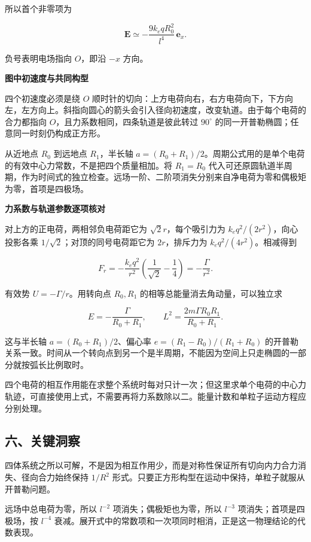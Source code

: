 \documentclass[12pt,a4paper,UTF8]{ctexart}
\begin{document}
所以首个非零项为

\[
\boxed{
\bm E
\simeq-\frac{9k_eqR_0^2}{l^4}\,\bm e_x
}.
\tag{13}
\]

负号表明电场指向 \(O\)，即沿 \(-x\) 方向。

\textbf{图中初速度与共同构型}

四个初速度必须是绕 \(O\)
顺时针的切向：上方电荷向右，右方电荷向下，下方向左，左方向上。斜指向圆心的箭头会引入径向初速度，改变轨道。由于每个电荷的合力都指向
\(O\)，且力系数相同，四条轨道是彼此转过 \(90^\circ\)
的同一开普勒椭圆；任意同一时刻仍构成正方形。

从近地点 \(R_0\) 到远地点 \(R_1\)，半长轴
\(a=(R_0+R_1)/2\)。周期公式用的是单个电荷的有效中心力常数，不是把四个质量相加。将
\(R_1=R_0\)
代入可还原圆轨道半周期，作为时间式的独立检查。远场一阶、二阶项消失分别来自净电荷为零和偶极矩为零，首项是四极场。

\textbf{力系数与轨道参数逐项核对}

对上方的正电荷，两相邻负电荷距它为 \(\sqrt2r\)，每个吸引力为
\(k_eq^2/(2r^2)\)，向心投影各乘 \(1/\sqrt2\)；对顶的同号电荷距它为
\(2r\)，排斥力为 \(k_eq^2/(4r^2)\)。相减得到

\[F_r=-\frac{k_eq^2}{r^2}\left(\frac1{\sqrt2}-\frac14\right)=-\frac\Gamma{r^2}.\]

有效势 \(U=-\Gamma/r\)。用转向点 \(R_0,R_1\)
的相等总能量消去角动量，可以独立求

\[E=-\frac{\Gamma}{R_0+R_1},\qquad L^2=\frac{2m\Gamma R_0R_1}{R_0+R_1}.\]

这与半长轴 \(a=(R_0+R_1)/2\)、偏心率 \(e=(R_1-R_0)/(R_1+R_0)\)
的开普勒关系一致。时间从一个转向点到另一个是半周期，不能因为空间上只走椭圆的一部分就按弧长比例取时。

四个电荷的相互作用能在求整个系统时每对只计一次；但这里求单个电荷的中心力轨迹，可直接使用上式，不需要再将力系数除以二。能量计数和单粒子运动方程应分别处理。

\subsection{六、关键洞察}\label{ux516dux5173ux952eux6d1eux5bdf-4}

四体系统之所以可解，不是因为相互作用少，而是对称性保证所有切向内力合力消失、径向合力始终保持
\(1/R^2\) 形式。只要正方形构型在运动中保持，单粒子就服从开普勒问题。

远场中总电荷为零，所以 \(l^{-2}\) 项消失；偶极矩也为零，所以 \(l^{-3}\)
项消失；首项是四极场，按 \(l^{-4}\)
衰减。展开式中的常数项和一次项同时相消，正是这一物理结论的代数表现。
\end{document}
